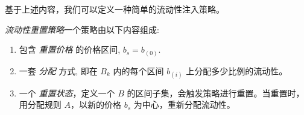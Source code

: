 \documentclass[sigconf, dvipsnames]{acmart}
\newcommand{\dcp}[1]{\textcolor{blue}{{\scriptsize{David:}}#1}}
\begin{document}



基于上述内容，我们可以定义一种简单的流动性注入策略。
%
\begin{definition}
\textit{流动性重置策略}\quad 一个策略由以下内容组成: 
\begin{enumerate}
    \item 包含 {\em 重置价格} 的价格区间, $b_{s}=b_{(0)}$.
    \item 一套 {\em 分配} 方式, 即在 $B_k$ 内的每个区间 $b_{(i)}$ 上分配多少比例的流动性。
    \item 一个 {\em 重置状态}，定义一个 $B$ 的区间子集，会触发策略进行重置。当重置时，用分配规则 $A$，以新的价格 $b_s$ 为中心，重新分配流动性。
\end{enumerate}
%
\end{definition}
\end{document}
